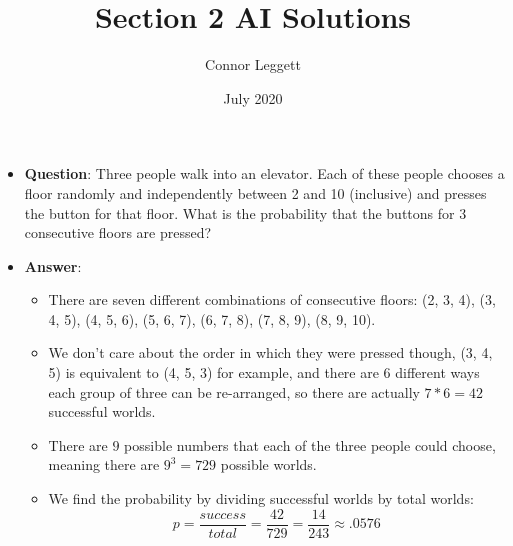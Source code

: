 \documentclass{article}
\title{Section 2 AI Solutions}
\author{Connor Leggett}
\date{July 2020}
\begin{document}
\maketitle

\section{}

\begin{itemize}
    \item \textbf{Question}: Three people walk into an elevator. Each of these people chooses a floor randomly and independently between 2 and 10 (inclusive) and presses the button for that floor. What is the probability that the buttons for 3 consecutive floors are pressed?
    \item \textbf{Answer}: 
    \begin{itemize}
        \item There are seven different combinations of consecutive floors: (2, 3, 4), (3, 4, 5), (4, 5, 6), (5, 6, 7), (6, 7, 8), (7, 8, 9), (8, 9, 10).
        \item We don't care about the order in which they were pressed though, (3, 4, 5) is equivalent to (4, 5, 3) for example, and there are 6 different ways each group of three can be re-arranged, so there are actually $7 * 6 = 42$ successful worlds.
        \item There are $9$ possible numbers that each of the three people could choose, meaning there are $9^3 = 729$ possible worlds.
        \item We find the probability by dividing successful worlds by total worlds:
        $$p = \frac{success}{total} = \frac{42}{729} = \boxed{\frac{14}{243} \approx .0576}$$
    \end{itemize}
\end{itemize}




\section{}
\end{document}
